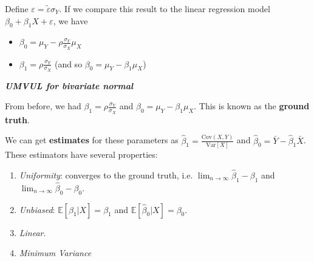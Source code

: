 \documentclass[11pt]{article}
\theoremstyle{definition}
\begin{document}
Define \(\varepsilon = \tilde{\varepsilon} \sigma_Y\). If we compare this result to the linear regression model \(\beta_0 + \beta_1 X + \varepsilon\), we have
\begin{itemize}
	\item \(\beta_0 = \mu_Y - \rho \frac{\sigma_Y}{\sigma_X} \mu_X\)
	\item \(\beta_1 = \rho \frac{\sigma_Y}{\sigma_X}\) (and so \(\beta_0 = \mu_Y - \beta_1 \mu_X\))
\end{itemize}

\textbf{\textsl{UMVUL for bivariate normal}}

From before, we had \(\beta_1 = \rho \frac{\sigma_Y}{\sigma_X}\) and \(\beta_0 = \mu_Y - \beta_1 \mu_X\). This is known as the \textbf{ground truth}. 

We can get \textbf{estimates} for these parameters as \(\hat{\beta}_1 = \frac{\mathrm{Cov}(X,Y)}{\mathrm{Var}[X]}\) and \(\hat{\beta}_0 = \bar{Y} - \hat{\beta}_1 \bar{X}\). These estimators have several properties:
\begin{enumerate}
	\item \textsl{Uniformity}: converges to the ground truth, i.e. \(\lim_{n\to\infty} \hat{\beta}_1 - \beta_1\) and \(\lim_{n\to\infty} \hat{\beta}_0 - \beta_0\).
	\item \textsl{Unbiased}: \(\mathbb{E}[\hat{\beta}_1 | X] = \beta_1\) and \(\mathbb{E}[\hat{\beta}_0 | X] = \beta_0\).
	\item \textsl{Linear}.
	\item \textsl{Minimum Variance}
\end{enumerate}

\end{document}
